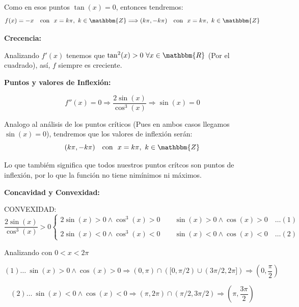 \documentclass[12pt]{article}
\begin{document}
\begin{enumerate}[\hspace{9px} a)]
            Como en esos puntos \(\tan(x)=0\), entonces tendremos: \[f(x)=-x \quad \text{con } \  x=k\pi, \ k\in\mathbbm{Z} \Longrightarrow (k\pi,-k\pi) \quad \text{con } \  x=k\pi, \ k\in\mathbbm{Z}\]

        \textbf{Crecencia: }\medskip

            Analizando \(f'(x)\) tenemos que \(\tan^2(x)>0 \ \forall x\in\mathbbm{R}\) (Por el cuadrado), as\'i, $f$ siempre es creciente.

        \textbf{Puntos y valores de Inflexi\'on: }\medskip

            \begin{equation*}
                f''(x)=0 \Longrightarrow \frac{2\sin(x)}{\cos^3(x)} \Longrightarrow \sin(x)=0
            \end{equation*}

            Analogo al an\'alisis de los puntos cr\'iticos (Pues en ambos casos llegamos \(\sin(x)=0\)), tendremos que los valores de inflexi\'on ser\'an:
            \[(k\pi,-k\pi) \quad \text{con } \  x=k\pi, \ k\in\mathbbm{Z}\]

            Lo que tambi\'em significa que todos nuestros puntos cr\'itcos son puntos de inflexi\'on, por lo que la funci\'on no tiene nim\'inimos ni m\'aximos.

        \textbf{Concavidad y Convexidad: }\medskip

        CONVEXIDAD:
        \begin{equation*}
            \frac{2\sin(x)}{\cos^3(x)}>0 
            \begin{cases}
                2\sin(x)>0 \wedge \cos^3(x)>0 \qquad \sin(x)>0 \wedge \cos(x)>0 \quad \dots (1)\\ \\
                2\sin(x)<0 \wedge \cos^3(x)<0 \qquad \sin(x)<0 \wedge \cos(x)<0 \quad \dots (2)
            \end{cases}
        \end{equation*}

        Analizando con \(0<x<2\pi\)

        \begin{equation*}
            (1) \dots \ \sin(x)>0 \wedge \cos(x)>0 \Longrightarrow (0,\pi) \cap ([0,\pi/2) \cup (3\pi/2,2\pi]) \Longrightarrow \left(0,\frac{\pi}{2}\right)
        \end{equation*}

        \begin{equation*}
            (2) \dots \ \sin(x)<0 \wedge \cos(x)<0 \Longrightarrow (\pi,2\pi) \cap (\pi/2,3\pi/2) \Longrightarrow \left(\pi,\frac{3\pi}{2}\right)
        \end{equation*}


\end{enumerate}
\end{document}
